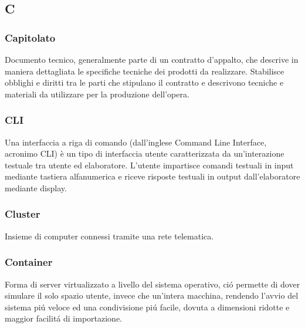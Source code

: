\subsection*{\textbf{\hfill \Huge{C} \hfill}} 
\subsubsection*{Capitolato}
Documento tecnico, generalmente parte di un contratto d'appalto, che descrive in maniera dettagliata le specifiche tecniche dei prodotti da realizzare. Stabilisce obblighi e diritti tra le parti che stipulano il contratto e descrivono tecniche e materiali da utilizzare per la produzione dell'opera. 

\subsubsection*{CLI}
Una interfaccia a riga di comando (dall'inglese Command Line Interface, acronimo CLI) è un tipo di interfaccia utente caratterizzata da un'interazione testuale tra utente ed elaboratore. L'utente impartisce comandi testuali in input mediante tastiera alfanumerica e riceve risposte testuali in output dall'elaboratore mediante display.

\subsubsection*{Cluster}
Insieme di computer connessi tramite una rete telematica.

\subsubsection*{Container}
Forma di server virtualizzato a livello del sistema operativo, ció permette di dover simulare il solo spazio utente, invece che un'intera macchina, rendendo l'avvio del sistema piú veloce ed una condivisione piú facile, dovuta a dimensioni ridotte e maggior facilitá di importazione. 